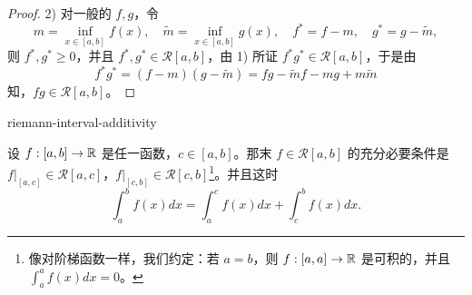 \begin{proof}
	2) 对一般的 \(f,g\)，令
	\[
	m=\inf_{x\in[a,b]}f(x),\quad \tilde m=\inf_{x\in[a,b]}g(x),\quad f^*=f-m,\quad g^*=g-\tilde m,
	\]
	则 \(f^*,g^*\ge0\)，并且 \(f^*,g^*\in\mathscr{R}[a,b]\)，由 1) 所证 \(f^*g^*\in\mathscr{R}[a,b]\)，于是由
	\[
	f^*g^*=(f-m)(g-\tilde m)=fg-\tilde m f-mg+m\tilde m
	\]
	知，\(fg\in\mathscr{R}[a,b]\)。

\end{proof}

\begin{mythm}{}{riemann-interval-additivity}

	设 \(f:[a,b]\to\mathbb{R}\) 是任一函数，\(c\in[a,b]\)。那末 \(f\in\mathscr{R}[a,b]\) 的充分必要条件是 \(f|_{[a,c]}\in\mathscr{R}[a,c]\)，\(f|_{[c,b]}\in\mathscr{R}[c,b]\)\footnote{像对阶梯函数一样，我们约定：若 \(a=b\)，则 \(f:[a,a]\to\mathbb{R}\) 是可积的，并且 \(\int_a^a f(x)dx=0\)。}。并且这时
	\[
	\int_a^b f(x)dx=\int_a^c f(x)dx+\int_c^b f(x)dx.
	\]

\end{mythm}


